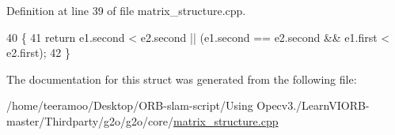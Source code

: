 Definition at line 39 of file matrix\+\_\+structure.\+cpp.


\begin{DoxyCode}
40   \{
41     \textcolor{keywordflow}{return} e1.second < e2.second || (e1.second == e2.second && e1.first < e2.first);
42   \}
\end{DoxyCode}


The documentation for this struct was generated from the following file\+:\begin{DoxyCompactItemize}
\item 
/home/teeramoo/\+Desktop/\+O\+R\+B-\/slam-\/script/\+Using Opecv3./\+Learn\+V\+I\+O\+R\+B-\/master/\+Thirdparty/g2o/g2o/core/\hyperlink{matrix__structure_8cpp}{matrix\+\_\+structure.\+cpp}\end{DoxyCompactItemize}
